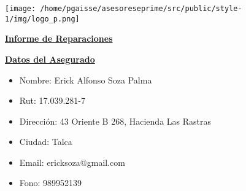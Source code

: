 \documentclass{article}
\begin{document}
\setlength\parindent{24pt}







\small

     \texttt{[image: /home/pgaisse/asesoreseprime/src/public/style-1/img/logo\_p.png]}
                        \begin{center}
                        \textbf{\underline{\LARGE Informe de Reparaciones}}
                        \end{center}

                        \textbf{\underline{Datos del Asegurado}}
                        \begin{itemize}
                        \item Nombre:  Erick Alfonso Soza Palma
                        \item Rut: 17.039.281-7
                        \item Dirección: 43 Oriente B  268, Hacienda Las Rastras
                        \item Ciudad: Talca
                        \item Email: ericksoza@gmail.com
                        \item Fono: 989952139
                        \end{itemize}
                        
\end{document}
